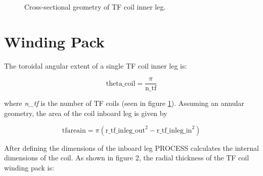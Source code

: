 \documentclass[hidelinks]{article}
\numberwithin{equation}{section}
\begin{document}
    \begin{figure}[!b]
     \begin{center}
    \end{center}
    \caption{Cross-sectional geometry of TF coil inner leg.} \label{fig: geom-1}
    \end{figure}

    \section{Winding Pack}

    \noi The toroidal angular extent of a single TF coil inner leg is:

    \begin{equation}\label{eq: theta_coil}
    \text{theta\_coil} = \frac{\pi}{\text{n\_tf}} 
    \end{equation}

    \noi where \emph{n\_tf} is the number of TF coils (seen in figure \ref{fig: geom-1}). 
    Assuming an annular geometry, the area of the coil inboard leg is given by  

    \begin{equation}\label{eq: tfareain}
    \text{tfareain} = \pi (\text{r\_tf\_inleg\_out}^2 - \text{r\_tf\_inleg\_in}^2) 
    \end{equation}

    \noi After defining the dimensions of the inboard leg PROCESS calculates 
    the internal dimensions of the coil. As shown in figure 2, the radial thickness 
    of the TF coil winding pack is:
\end{document}
